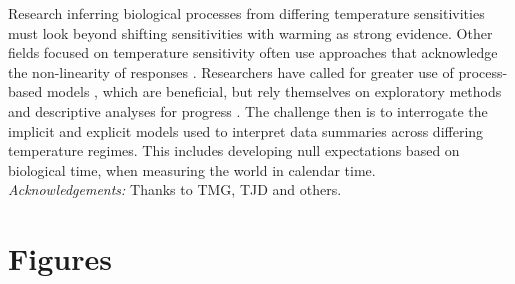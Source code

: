 \documentclass[11pt,letter]{article}
\begin{document}
Research inferring biological processes from differing temperature sensitivities must look beyond shifting sensitivities with warming as strong evidence. Other fields focused on temperature sensitivity often use approaches that acknowledge the non-linearity of responses \citep[e.g.,][]{yuste2004}. Researchers have called for greater use of process-based models \citep{keenan2019}, which are beneficial, but rely themselves on exploratory methods and descriptive analyses for progress \citep{chuine2016}. The challenge then is to interrogate the implicit and explicit models used to interpret data summaries across differing temperature regimes. This includes developing null expectations based on biological time, when measuring the world in calendar time. \\

\emph{Acknowledgements:} Thanks to TMG, TJD and others. 





\newpage
\section* {Figures}
\end{document}
